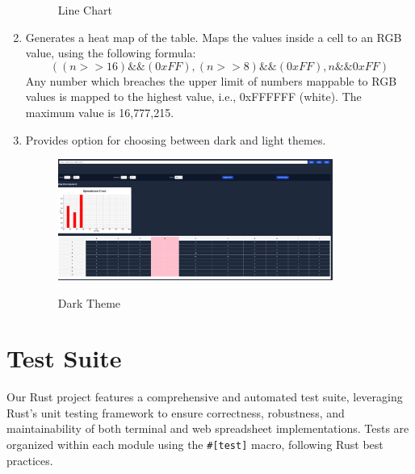 \documentclass{article}
\begin{document}
\begin{enumerate}
\begin{figure}[t]
    \caption{Line Chart}
    \end{figure}
    \item Generates a heat map of the table. Maps the values inside a cell to an RGB value, using the following formula:
    $$((n>>16) \&\& (0xFF), (n>>8) \&\& (0xFF), n \&\& 0xFF)$$
    Any number which breaches the upper limit of numbers mappable to RGB values is mapped to the highest value, i.e., 0xFFFFFF (white). The maximum value is 16,777,215.
    \item Provides option for choosing between dark and light themes.
    \begin{figure}[t]
    \centering
    {{\includegraphics[width=9cm]{theme.jpg}}}
    \caption{Dark Theme}
    \end{figure}
\end{enumerate}

\section{Test Suite}

Our Rust project features a comprehensive and automated test suite, leveraging Rust's unit testing framework to ensure correctness, robustness, and maintainability of both terminal and web spreadsheet implementations. Tests are organized within each module using the \texttt{#[test]} macro, following Rust best practices.
\end{document}
